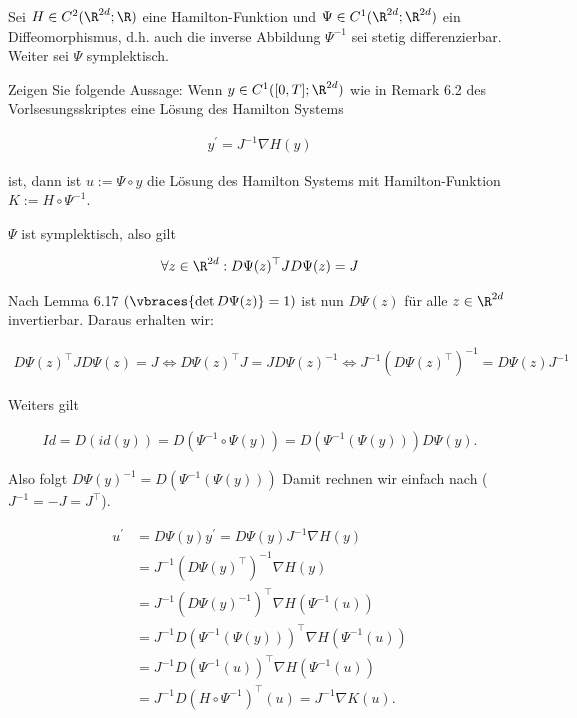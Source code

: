 \begin{exercise}
  Sei $H \in C^2(\R^{2d};\R)$ eine Hamilton-Funktion und
  $\Psi \in C^1(\R^{2d};\R^{2d})$ ein Diffeomorphismus,
  d.h. auch die inverse Abbildung $\Psi^{-1}$ sei stetig
  differenzierbar. Weiter sei $\Psi$ symplektisch.

  Zeigen Sie folgende Aussage: Wenn $y \in C^1([0,T];\R^{2d})$
  wie in Remark 6.2 des Vorlsesungsskriptes eine Lösung des
  Hamilton Systems

  \begin{align}
    y^\prime = J^{-1}\nabla H(y)
  \end{align}

  ist, dann ist $u := \Psi \circ y$ die Lösung des Hamilton
  Systems mit Hamilton-Funktion $K := H \circ \Psi^{-1}$.
\end{exercise}

\begin{solution}
  $\Psi$ ist symplektisch, also gilt

  \begin{align*}
    \forall z \in \R^{2d}: D\Psi(z)^{\top}JD\Psi(z) = J
  \end{align*}

  Nach Lemma 6.17 $(\vbraces{\det D\Psi(z)} = 1)$ ist nun $D\Psi(z)$ für alle
  $z \in \R^{2d}$ invertierbar. Daraus erhalten wir:

  \begin{align*}
     D\Psi(z)^\top JD\Psi(z) = J
     \iff
     D\Psi(z)^\top J = J D\Psi(z)^{-1}
     \iff
     J^{-1}(D\Psi(z)^\top)^{-1} = D\Psi(z) J^{-1}
  \end{align*}

  Weiters gilt

  \begin{align*}
    Id = D(id(y)) = D(\Psi^{-1} \circ \Psi(y)) = D(\Psi^{-1}(\Psi(y)))D\Psi(y).
  \end{align*}

  Also folgt $D\Psi(y)^{-1} =  D(\Psi^{-1}(\Psi(y)))$
  Damit rechnen wir einfach nach ($J^{-1} = -J = J^{\top}$).

  \begin{align*}
    u^{\prime} &= D \Psi(y)y^{\prime}
    = D\Psi(y)J^{-1}\nabla H(y)\\
    &= J^{-1}(D\Psi(y)^\top)^{-1} \nabla H(y)\\
    &= J^{-1}(D\Psi(y)^{-1})^{\top}\nabla H(\Psi^{-1}(u)) \\
    &= J^{-1}D(\Psi^{-1}(\Psi(y)))^{\top}\nabla H(\Psi^{-1}(u)) \\
    &= J^{-1}D(\Psi^{-1}(u))^{\top}\nabla H(\Psi^{-1}(u)) \\
    &= J^{-1}D(H \circ \Psi^{-1})^{\top}(u) =  J^{-1}\nabla K(u).
  \end{align*}

\end{solution}
